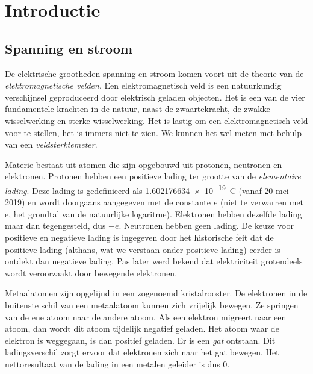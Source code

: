 \chapter{Introductie}
\label{cha:introductie}


\section{Spanning en stroom}
De elektrische grootheden spanning en stroom komen voort uit de theorie van de \textsl{elektromagnetische velden}. Een elektromagnetisch veld is een natuurkundig verschijnsel geproduceerd door elektrisch geladen objecten. Het is een van de vier fundamentele krachten in de natuur, naast de zwaartekracht, de zwakke wisselwerking en sterke wisselwerking. Het is lastig om een elektromagnetisch veld voor te stellen, het is immers niet te zien. We kunnen het wel meten met behulp van een \textsl{veldsterktemeter}.

Materie bestaat uit atomen die zijn opgebouwd uit protonen, neutronen en elektronen. Protonen hebben een positieve lading ter grootte van de \textsl{elementaire lading}. Deze lading is gedefinieerd als \SI{1.602176634e-19}{\coulomb} (vanaf 20 mei 2019) en wordt doorgaans aangegeven met de constante $e$ (niet te verwarren met e, het grondtal van de natuurlijke logaritme). Elektronen hebben dezelfde lading maar dan tegengesteld, dus $-e$. Neutronen hebben geen lading. De keuze voor positieve en negatieve lading is ingegeven door het historische feit dat de positieve lading (althans, wat we verstaan onder positieve lading) eerder is ontdekt dan negatieve lading. Pas later werd bekend dat elektriciteit grotendeels wordt veroorzaakt door bewegende elektronen.

Metaalatomen zijn opgelijnd in een zogenoemd kristalrooster. De elektronen in de buitenste schil van een metaalatoom kunnen zich vrijelijk bewegen. Ze springen van de ene atoom naar de andere atoom. Als een elektron migreert naar een atoom, dan wordt dit atoom tijdelijk negatief geladen. Het atoom waar de elektron is weggegaan, is dan positief geladen. Er is een \textsl{gat} ontstaan. Dit ladingsverschil zorgt ervoor dat elektronen zich naar het gat bewegen. Het nettoresultaat van de lading in een metalen geleider is dus 0.

